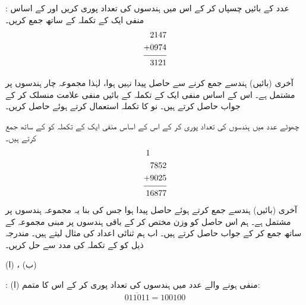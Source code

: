 :\quad
 عدد  کے بائیں  چسپاں کر کے اس میں ہندسوں کی تعداد پوری کریں اور  کے اساس منفی ایک کے تکملہ کے ساتھ جمع کریں۔
 \begin{align*}
 \begin{split}
 2147&\\
 +0974&\\
 \noalign{\smallskip}\hline\noalign{\smallskip}
 3121&
 \end{split}
 \end{align*}

آخری (بائیں) ہندسے جمع کرنے سے حاصل  پیدا نہیں ہوا، لہٰذا مجموعہ چار ہندسوں پر مشتمل ہے۔ اس کے اساس منفی ایک کے تکملہ  کے بائیں منفی علامت منسلک کر کے جواب  حاصل کرتے ہیں۔
نو کا تکملہ استعمال کرتے ہوئے  حاصل کریں۔ 

\quad
چھوٹے عدد  میں ہندسوں کی تعداد پوری کر کے اس کے اساس منفی ایک کے تکملہ  کو  کے ساتھ جمع کرتے ہیں۔
 \begin{align*}
 \begin{split}
 1\phantom{7852}&\\
 7852&\\
 +9025&\\
 \noalign{\smallskip}\hline\noalign{\smallskip}
 16877&
 \end{split}
 \end{align*}
 آخری (بائیں) ہندسے جمع کرتے ہوئے حاصل  پیدا ہوا جس کی بنا یہ مجموعہ  ہندسوں پر مشتمل ہے۔ ہم اس حاصل  کو وزن  مختص کر کے باقی  ہندسوں پر مبنی مجموعہ  کے ساتھ جمع کر کے جواب  حاصل کرتے ہیں۔
اب ہم ثنائی اعداد کی مثال لیتے ہیں۔
 مندرجہ ذیل کو  کے تکملہ کی مدد سے حل کریں۔

(ا) ، (ب)  

:\quad
 (ا) منفی ہونے والے عدد میں ہندسوں کی تعداد پوری کر کے اس کا متمم:
 \begin{align*}
 \overline{011011}=100100
 \end{align*}

